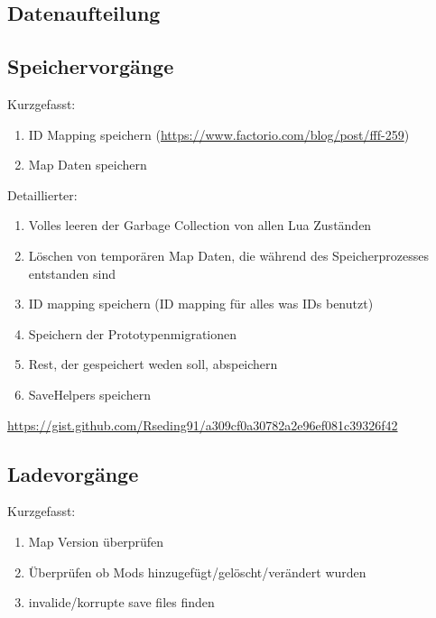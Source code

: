 \subsection{Datenaufteilung}

\subsection{Speichervorgänge}
Kurzgefasst:
\begin{enumerate}
    \item ID Mapping speichern (\url{https://www.factorio.com/blog/post/fff-259})
    \item Map Daten speichern
\end{enumerate}

Detaillierter:
\begin{enumerate}
    \item Volles leeren der Garbage Collection von allen Lua Zuständen
    \item Löschen von temporären Map Daten, die während des Speicherprozesses entstanden sind
    \item ID mapping speichern (ID mapping für alles was IDs benutzt)
    \item Speichern der Prototypenmigrationen
    \item Rest, der gespeichert weden soll, abspeichern
    \item SaveHelpers speichern
\end{enumerate}
\url{https://gist.github.com/Rseding91/a309cf0a30782a2e96ef081c39326f42}

\subsection{Ladevorgänge}
Kurzgefasst:
\begin{enumerate}
    \item Map Version überprüfen
    \item Überprüfen ob Mods hinzugefügt/gelöscht/verändert wurden
    \item invalide/korrupte save files finden 
\end{enumerate}

